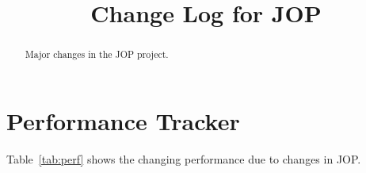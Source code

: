 \documentclass[a4paper,12pt]{scrartcl}
\begin{document}
\title{Change Log for JOP}
\maketitle \thispagestyle{empty}

\begin{abstract}

Major changes in the JOP project.

\end{abstract}



\section{Performance Tracker}

Table~\ref{tab:perf} shows the changing performance due to changes
in JOP.
\end{document}
